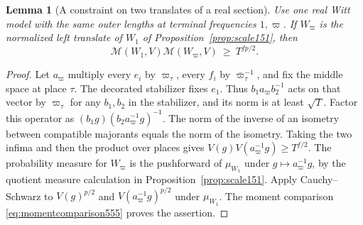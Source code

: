 \documentclass[a4paper,11pt]{article}
\newtheorem{lemma}[proposition]{Lemma}
\theoremstyle{definition}
\theoremstyle{remark}
\numberwithin{equation}{section}
\begin{document}
\begin{lemma}[A constraint on two translates of a real section]
\leavevmode\label{lem:twomoments555}
Use one real Witt model with the same outer lengths at terminal
frequencies \(1,\varpi\). If \(W_\varpi\) is the normalized
left translate of \(W_1\) of Proposition~\ref{prop:scale151}, then
\[
            \mathcal M(W_1,V)\mathcal M(W_\varpi,V)
                                     \ \ge\ T^{fp/2}.
\]
\end{lemma}
\begin{proof}
Let \(a_\varpi\) multiply every \(e_i\) by \(\varpi_\tau\),
every \(f_i\) by \(\bar\varpi_\tau^{-1}\), and fix the middle
space at place \(\tau\). The decorated stabilizer fixes
\(e_1\). Thus \(b_1a_\varpi b_2^{-1}\) acts on that vector by
\(\varpi_\tau\) for any \(b_1,b_2\) in the stabilizer, and
its norm is at least \(\sqrt T\). Factor this operator as
\((b_1g)(b_2a_\varpi^{-1}g)^{-1}\). The norm of the inverse
of an isometry between compatible majorants equals the norm
of the isometry. Taking the two infima and then the product
over places gives \(V(g)V(a_\varpi^{-1}g)\ge T^{f/2}\).
The probability measure for \(W_\varpi\) is the pushforward
of \(\mu_{W_1}\) under \(g\mapsto a_\varpi^{-1}g\), by the
quotient measure calculation in Proposition~\ref{prop:scale151}.
Apply Cauchy--Schwarz to \(V(g)^{p/2}\) and
\(V(a_\varpi^{-1}g)^{p/2}\) under \(\mu_{W_1}\). The moment
comparison \eqref{eq:momentcomparison555} proves the assertion.
\end{proof}
\end{document}
